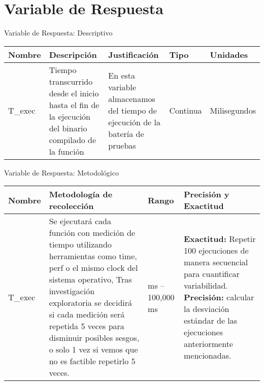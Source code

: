 \documentclass[aspectratio=169]{beamer}
\begin{document}
\section{Variable de Respuesta}

\begin{frame}{Variable de Respuesta: Descriptivo}
    \begin{table}
        \begin{tabularx}{\textwidth}{|>{\raggedright\arraybackslash}p{2cm}|>{\raggedright\arraybackslash}X|>{\raggedright\arraybackslash}X|>{\raggedright\arraybackslash}p{2cm}|>{\raggedright\arraybackslash}p{2cm}|}
            \hline
            \textbf{Nombre} & \textbf{Descripción} & \textbf{Justificación} & \textbf{Tipo} & \textbf{Unidades} \\
            \hline
            T\_exec & Tiempo transcurrido desde el inicio hasta el fin de la ejecución del binario compilado de la función & En esta variable almacenamos del tiempo de ejecución de la batería de pruebas & Continua & Milisegundos \\
            \hline
        \end{tabularx}
    \end{table}
\end{frame}

\begin{frame}{Variable de Respuesta: Metodológico}
    \begin{table}
        \begin{tabularx}{\textwidth}{|>{\raggedright\arraybackslash}p{2cm}|>{\raggedright\arraybackslash}X|>{\raggedright\arraybackslash}p{2cm}|>{\raggedright\arraybackslash}X|}
            \hline
            \textbf{Nombre} & \textbf{Metodología de recolección} & \textbf{Rango} & \textbf{Precisión y Exactitud} \\
            \hline
            T\_exec & Se ejecutará cada función con medición de tiempo utilizando herramientas como time, perf o el mismo clock del sistema operativo, Tras investigación exploratoria se decidirá si cada medición será repetida 5 veces para disminuir posibles sesgos, o solo 1 vez si vemos que no es factible repetirlo 5 veces. & 0 ms – 100,000 ms & \textbf{Exactitud:} Repetir 100 ejecuciones de manera secuencial para cuantificar variabilidad. \newline \textbf{Precisión:} calcular la desviación estándar de las ejecuciones anteriormente mencionadas. \\
            \hline
        \end{tabularx}
    \end{table}
\end{frame}
\end{document}

